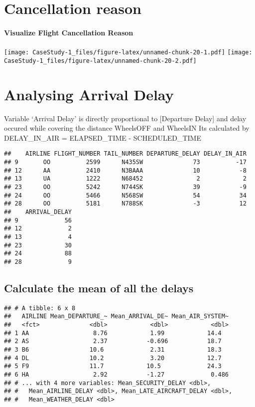 \documentclass[]{article}
\let\oldparagraph\paragraph
\renewcommand{\paragraph}[1]{\oldparagraph{#1}\mbox{}}
\begin{document}
\hypertarget{cancellation-reason}{%
\section{Cancellation reason}\label{cancellation-reason}}

\hypertarget{visualize-flight-cancellation-reason}{%
\paragraph{Visualize Flight Cancellation
Reason}\label{visualize-flight-cancellation-reason}}

\texttt{[image: CaseStudy-1\_files/figure-latex/unnamed-chunk-20-1.pdf]}
\texttt{[image: CaseStudy-1\_files/figure-latex/unnamed-chunk-20-2.pdf]}

\hypertarget{analysing-arrival-delay}{%
\section{Analysing Arrival Delay}\label{analysing-arrival-delay}}

Variable `Arrival Delay' is directly proportional to {[}Departure
Delay{]} and delay occured while covering the distance WheelsOFF and
WheelsIN Its calculated by DELAY\_IN\_AIR = ELAPSED\_TIME -
SCHEDULED\_TIME

\begin{verbatim}
##    AIRLINE FLIGHT_NUMBER TAIL_NUMBER DEPARTURE_DELAY DELAY_IN_AIR
## 9       OO          2599      N435SW              73          -17
## 12      AA          2410      N3BAAA              10           -8
## 13      UA          1222      N68452               2            2
## 23      OO          5242      N744SK              39           -9
## 24      OO          5466      N568SW              54           34
## 28      OO          5181      N788SK              -3           12
##    ARRIVAL_DELAY
## 9             56
## 12             2
## 13             4
## 23            30
## 24            88
## 28             9
\end{verbatim}

\hypertarget{calculate-the-mean-of-all-the-delays}{%
\subsection{Calculate the mean of all the
delays}\label{calculate-the-mean-of-all-the-delays}}

\begin{verbatim}
## # A tibble: 6 x 8
##   AIRLINE Mean_DEPARTURE_~ Mean_ARRIVAL_DE~ Mean_AIR_SYSTEM~
##   <fct>              <dbl>            <dbl>            <dbl>
## 1 AA                  8.76            1.99            14.4  
## 2 AS                  2.37           -0.696           18.7  
## 3 B6                 10.6             2.31            18.3  
## 4 DL                 10.2             3.20            12.7  
## 5 F9                 11.7            10.5             24.3  
## 6 HA                  2.92           -1.27             0.486
## # ... with 4 more variables: Mean_SECURITY_DELAY <dbl>,
## #   Mean_AIRLINE_DELAY <dbl>, Mean_LATE_AIRCRAFT_DELAY <dbl>,
## #   Mean_WEATHER_DELAY <dbl>
\end{verbatim}
\end{document}
